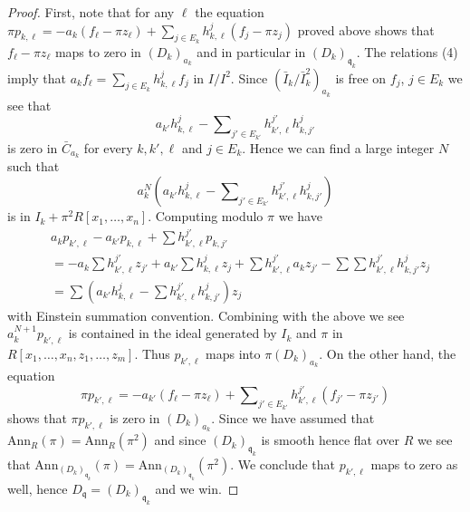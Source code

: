 \begin{proof}
\medskip\noindent
First, note that for any $\ell$ the equation
$\pi p_{k, \ell} = -a_k(f_\ell - \pi z_\ell) +
\sum_{j \in E_k} h_{k, \ell}^j (f_j - \pi z_j)$ proved above shows that
$f_\ell - \pi z_\ell$ maps to zero in $(D_k)_{a_k}$ and in particular
in $(D_k)_{\mathfrak q_k}$.
The relations (4) imply that $a_k f_\ell =
\sum_{j \in E_k} h_{k, \ell}^j f_j$ in $I/I^2$.
Since $(\bar I_k/\bar I_k^2)_{a_k}$ is free on $f_j$, $j \in E_k$
we see that
$$
a_{k'} h_{k, \ell}^j -
\sum\nolimits_{j' \in E_{k'}} h_{k', \ell}^{j'} h_{k, j'}^j
$$
is zero in $\bar C_{a_k}$ for every $k, k', \ell$ and $j \in E_k$.
Hence we can find a large integer $N$ such that
$$
a_k^N\left(
a_{k'} h_{k, \ell}^j -
\sum\nolimits_{j' \in E_{k'}} h_{k', \ell}^{j'} h_{k, j'}^j
\right)
$$
is in $I_k + \pi^2R[x_1, \ldots, x_n]$. Computing modulo $\pi$ we have
\begin{align*}
&
a_kp_{k', \ell} - a_{k'}p_{k, \ell} + \sum h_{k', \ell}^{j'} p_{k, j'}
\\
&
=
- a_k \sum h_{k', \ell}^{j'} z_{j'}
+ a_{k'} \sum h_{k, \ell}^j z_j
+ \sum h_{k', \ell}^{j'} a_k z_{j'}
- \sum \sum h_{k', \ell}^{j'} h_{k, j'}^j z_j \\
&
=
\sum \left(
a_{k'} h_{k, \ell}^j
- \sum h_{k', \ell}^{j'} h_{k, j'}^j
\right) z_j
\end{align*}
with Einstein summation convention. Combining with the above we see
$a_k^{N + 1} p_{k', \ell}$ is contained in the ideal generated
by $I_k$ and $\pi$ in $R[x_1, \ldots, x_n, z_1, \ldots, z_m]$.
Thus $p_{k', \ell}$ maps into $\pi (D_k)_{a_k}$. On the other hand,
the equation
$$
\pi p_{k', \ell} =
-a_{k'} (f_\ell - \pi z_\ell) +
\sum\nolimits_{j' \in E_{k'}} h_{k', \ell}^{j'}(f_{j'} - \pi z_{j'})
$$
shows that $\pi p_{k', \ell}$ is zero in $(D_k)_{a_k}$.
Since we have assumed that $\text{Ann}_R(\pi) = \text{Ann}_R(\pi^2)$
and since $(D_k)_{\mathfrak q_k}$ is smooth hence flat over $R$
we see that
$\text{Ann}_{(D_k)_{\mathfrak q_k}}(\pi) =
\text{Ann}_{(D_k)_{\mathfrak q_k}}(\pi^2)$.
We conclude that $p_{k', \ell}$ maps to zero as well, hence
$D_{\mathfrak q} = (D_k)_{\mathfrak q_k}$ and we win.
\end{proof}

















